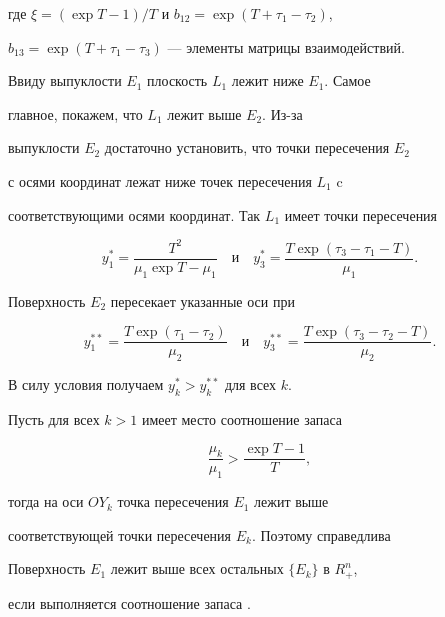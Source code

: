 \begin{pf}
\medskip





\noindent{}где $\xi=(\exp T -1)/T$ и $b_{12}=\exp(T+\tau_1-\tau_2)$, 


$b_{13}=\exp(T+\tau_1-\tau_3)$ --- элементы матрицы взаимодействий. 


Ввиду выпуклости $E_1$ плоскость $L_1$ лежит ниже $E_1$. Самое 


главное, покажем, что $L_1$ лежит выше $E_2$. Из-за 


выпуклости $E_2$ достаточно установить, что точки пересечения $E_2$ 


с осями координат лежат ниже точек пересечения $L_1$ c 


соответствующими осями координат. Так $L_1$ имеет точки пересечения


$$


y_1^*=\frac{T^2}{\mu_1\exp T -\mu_1}\quad\text{и}\quad


y_3^*=\frac{T\exp(\tau_3-\tau_1-T)}{\mu_1}.


$$


Поверхность $E_2$ пересекает указанные оси при


$$


y_1^{**}=\frac{T\exp(\tau_1-\tau_2)}{\mu_2}\quad\text{и}\quad


y_3^{**}=\frac{T\exp(\tau_3-\tau_2-T)}{\mu_2}.


$$


В силу условия  получаем $y_k^*>y_k^{**}$ для всех $k$. 


\end{pf}





Пусть для всех $k>1$ имеет место соотношение запаса


\begin{equation}


\frac{\mu_k}{\mu_1}>\frac{\exp T -1}{T},


\label{2.6}


\end{equation}


тогда на оси $OY_k$ точка пересечения $E_1$ лежит выше 


соответствующей точки пересечения $E_k$. Поэтому справедлива





\begin{lems}%


Поверхность $E_1$ лежит выше всех остальных $\{E_k\}$ в $R_+^n$, 


если выполняется соотношение запаса .


\end{lems}%





